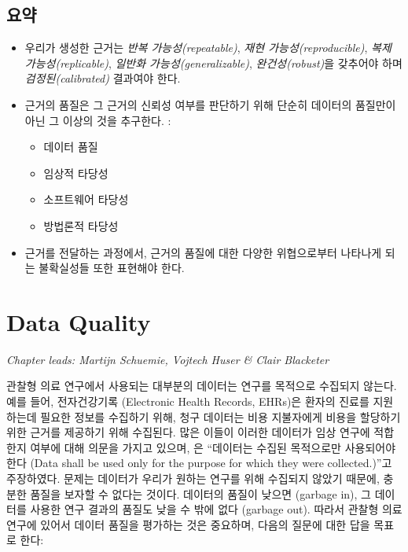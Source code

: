 \documentclass[11pt]{book}
\providecommand{\tightlist}{%
  \setlength{\itemsep}{0pt}\setlength{\parskip}{0pt}}
\theoremstyle{definition}
\theoremstyle{definition}
\theoremstyle{definition}
\theoremstyle{remark}
\let\BeginKnitrBlock\begin \let\EndKnitrBlock\end
\begin{document}
\section{요약}\label{-12}

\BeginKnitrBlock{rmdsummary}
\begin{itemize}
\item
  우리가 생성한 근거는 \emph{반복 가능성(repeatable)}, \emph{재현
  가능성(reproducible)}, \emph{복제 가능성(replicable)}, \emph{일반화
  가능성(generalizable)}, \emph{완건성(robust)}을 갖추어야 하며
  \emph{검정된(calibrated)} 결과여야 한다.
\item
  근거의 품질은 그 근거의 신뢰성 여부를 판단하기 위해 단순히 데이터의
  품질만이 아닌 그 이상의 것을 추구한다. :

  \begin{itemize}
  \tightlist
  \item
    데이터 품질
  \item
    임상적 타당성
  \item
    소프트웨어 타당성
  \item
    방법론적 타당성
  \end{itemize}
\item
  근거를 전달하는 과정에서, 근거의 품질에 대한 다양한 위협으로부터
  나타나게 되는 불확실성들 또한 표현해야 한다.
\end{itemize}
\EndKnitrBlock{rmdsummary}

\chapter{Data Quality}\label{DataQuality}

\emph{Chapter leads: Martijn Schuemie, Vojtech Huser \& Clair Blacketer}

관찰형 의료 연구에서 사용되는 대부분의 데이터는 연구를 목적으로 수집되지
않는다. 예를 들어, 전자건강기록 (Electronic Health Records, EHRs)은
환자의 진료를 지원하는데 필요한 정보를 수집하기 위해, 청구 데이터는 비용
지불자에게 비용을 할당하기 위한 근거를 제공하기 위해 수집된다. 많은
이들이 이러한 데이터가 임상 연구에 적합한지 여부에 대해 의문을 가지고
있으며, \citet{vanDerLei_1991} 은 ``데이터는 수집된 목적으로만
사용되어야 한다 (Data shall be used only for the purpose for which they
were collected.)''고 주장하였다. 문제는 데이터가 우리가 원하는 연구를
위해 수집되지 않았기 때문에, 충분한 품질을 보자할 수 없다는 것이다.
데이터의 품질이 낮으면 (garbage in), 그 데이터를 사용한 연구 결과의
품질도 낮을 수 밖에 없다 (garbage out). 따라서 관찰형 의료 연구에 있어서
데이터 품질을 평가하는 것은 중요하며, 다음의 질문에 대한 답을 목표로
한다:
\end{document}
